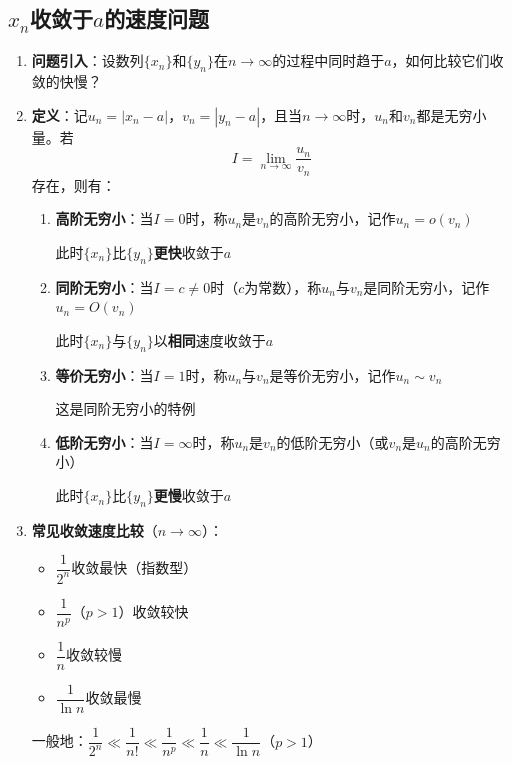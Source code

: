 \documentclass[a4paper,12pt]{article}
\begin{document}
    \subsection{${x_n}$收敛于$a$的速度问题}

    \begin{enumerate}
        \item \textbf{问题引入}：设数列$\{x_n\}$和$\{y_n\}$在$n\to\infty$的过程中同时趋于$a$，如何比较它们收敛的快慢？

        \item \textbf{定义}：记$u_n = |x_n - a|$，$v_n = |y_n - a|$，且当$n\to\infty$时，$u_n$和$v_n$都是无穷小量。若
        \[
            I = \lim_{n\to\infty} \frac{u_n}{v_n}
        \]
        存在，则有：

        \begin{enumerate}
            \item \textbf{高阶无穷小}：当$I = 0$时，称$u_n$是$v_n$的高阶无穷小，记作$u_n = o(v_n)$

            此时$\{x_n\}$比$\{y_n\}$\textbf{更快}收敛于$a$

            \item \textbf{同阶无穷小}：当$I = c \neq 0$时（$c$为常数），称$u_n$与$v_n$是同阶无穷小，记作$u_n = O(v_n)$

            此时$\{x_n\}$与$\{y_n\}$以\textbf{相同}速度收敛于$a$

            \item \textbf{等价无穷小}：当$I = 1$时，称$u_n$与$v_n$是等价无穷小，记作$u_n \sim v_n$

            这是同阶无穷小的特例

            \item \textbf{低阶无穷小}：当$I = \infty$时，称$u_n$是$v_n$的低阶无穷小（或$v_n$是$u_n$的高阶无穷小）

            此时$\{x_n\}$比$\{y_n\}$\textbf{更慢}收敛于$a$
        \end{enumerate}

        \item \textbf{常见收敛速度比较}（$n\to\infty$）：
        \begin{itemize}
            \item $\dfrac{1}{2^n}$收敛最快（指数型）
            \item $\dfrac{1}{n^p}$（$p > 1$）收敛较快
            \item $\dfrac{1}{n}$收敛较慢
            \item $\dfrac{1}{\ln n}$收敛最慢
        \end{itemize}

        一般地：$\dfrac{1}{2^n} \ll \dfrac{1}{n!} \ll \dfrac{1}{n^p} \ll \dfrac{1}{n} \ll \dfrac{1}{\ln n}$（$p > 1$）
    \end{enumerate}
\end{document}
